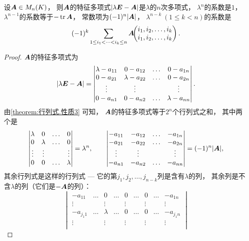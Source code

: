 \begin{proposition}
设\(\boldsymbol{A} \in M_n(K)\)，
则\(\boldsymbol{A}\)的特征多项式\(\abs{\lambda\boldsymbol{E}-\boldsymbol{A}}\)是\(\lambda\)的\(n\)次多项式，
\(\lambda^n\)的系数是\(1\)，
\(\lambda^{n-1}\)的系数等于\(-\tr\boldsymbol{A}\)，
常数项为\((-1)^n \abs{\boldsymbol{A}}\)，
\(\lambda^{n-k}\ (1\leq k<n)\)的系数是\[
	(-1)^k \sum_{1 \leq i_1 < \dotsb < i_k \leq n} \boldsymbol{A}\kern-3.8pt\begin{pmatrix}
		i_1,i_2,\dotsc,i_k \\
		i_1,i_2,\dotsc,i_k
	\end{pmatrix}.
\]
\begin{proof}
\(\boldsymbol{A}\)的特征多项式为\[
	\abs{\lambda\boldsymbol{E}-\boldsymbol{A}}
	= \begin{vmatrix}
		\lambda-a_{11} & 0-a_{12} & \dots & 0-a_{1n} \\
		0-a_{21} & \lambda-a_{22} & \dots & 0-a_{2n} \\
		\vdots & \vdots && \vdots \\
		0-a_{n1} & 0-a_{n2} & \dots & \lambda-a_{nn}
	\end{vmatrix}.
\]
由\cref{theorem:行列式.性质3} 可知，
\(\boldsymbol{A}\)的特征多项式等于\(2^n\)个行列式之和，
其中两个是\[
	\begin{vmatrix}
		\lambda & 0 & \dots & 0 \\
		0 & \lambda & \dots & 0 \\
		\vdots & \vdots && \vdots \\
		0 & 0 & \dots & \lambda
	\end{vmatrix}
	= \lambda^n,
	\qquad
	\begin{vmatrix}
		-a_{11} & -a_{12} & \dots & -a_{1n} \\
		-a_{21} & -a_{22} & \dots & -a_{2n} \\
		\vdots & \vdots && \vdots \\
		-a_{n1} & -a_{n2} & \dots & -a_{nn}
	\end{vmatrix}
	= (-1)^n \abs{\boldsymbol{A}},
\]
其余行列式是这样的行列式 --- 它的第\(j_1,j_2,\dotsc,j_{n-k}\)列是含有\(\lambda\)的列，
其余列是不含\(\lambda\)的列（它们是\(-\boldsymbol{A}\)的列）：\begin{equation*}
	\begin{vmatrix}
		-a_{11} & \dots & 0 & \dots & 0 & \dots & 0 & \dots & -a_{1n} \\
		\vdots & & \vdots & & \vdots & & \vdots & & \vdots \\
		-a_{j_1 1} & \dots & \lambda & \dots & 0 & \dots & 0 & \dots & -a_{j_1 n} \\
		\vdots & & \vdots & & \vdots & & \vdots & & \vdots \\

\end{vmatrix}
\end{equation*}
\end{proof}
\end{proposition}
